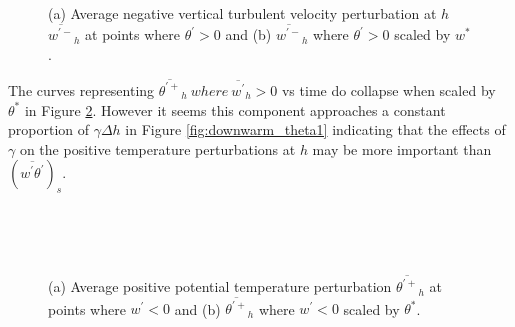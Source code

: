\begin{figure}[htbp]
\begin{minipage}[b]{0.5\linewidth}
        \\
        \end{minipage}             
\quad
\begin{minipage}[b]{0.5\linewidth}
        \\       
       \end{minipage}
        \caption[Downward turbulent velocity perturbation at $h$]{(a) Average negative vertical turbulent velocity perturbation at $h$ $\overline{w^{\prime-}}_{h}$ at points where $\theta^{\prime}>0$ and (b) $\overline{w^{\prime-}}_{h}$ where $\theta^{\prime}>0$ scaled by $w^{*}$.}
        \label{fig:downwarm_wvel}
\end{figure}

The curves representing $\overline{\theta^{'+}}_{h} \ where \ \overline{w^{'}}_{h}>0$ vs time do collapse when scaled by $\theta^{*}$ in Figure \ref{fig:downwarm_theta}.  However it seems this component approaches a constant proportion of $\gamma \Delta h$ in Figure \ref{fig:downwarm_theta1} indicating that the effects of $\gamma$ on the positive temperature perturbations at $h$ may be more important than $(\overline{w^{'}\theta^{'}})_{s}$.\\ 

\begin{figure}[htbp]
\begin{minipage}[b]{0.5\linewidth}
        \\
        \end{minipage}             
\quad
\begin{minipage}[b]{0.5\linewidth}
        \\      
       \end{minipage}
        \caption[Positive potential temperature perturbation at $h$ (i)]{(a) Average positive potential temperature perturbation $\overline{\theta^{\prime+}}_{h}$ at points where $w^{\prime}<0$ and (b) $\overline{\theta^{\prime+}}_{h}$ where $w^{\prime}<0$ scaled by $\theta^{*}$.}
        \label{fig:downwarm_theta}
\end{figure}

